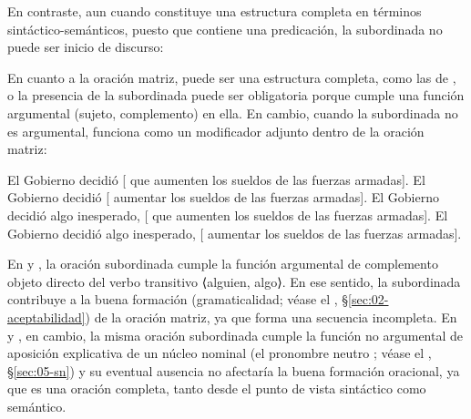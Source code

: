 En contraste, aun cuando constituye una estructura completa en términos
sintáctico-semánticos, puesto que contiene una predicación, la subordinada no
puede ser inicio de discurso:

\begin{exe}
  \ex
    \begin{xlist}
    \end{xlist}
\end{exe}

En cuanto a la oración matriz, puede ser una estructura completa, como las de
, o la presencia de la subordinada puede ser obligatoria
porque cumple una función argumental (sujeto, complemento) en ella. En cambio,
cuando la subordinada no es argumental, funciona como un modificador adjunto
dentro de la oración matriz:

\begin{exe}
  \ex\label{ex:13-decidio}
    \begin{xlist}
      \ex\label{ex:13-decidio-a} El Gobierno decidió [ que aumenten los
          sueldos de las fuerzas armadas].
      \ex\label{ex:13-decidio-b} El Gobierno decidió [ aumentar los
          sueldos de las fuerzas armadas].
      \ex\label{ex:13-decidio-c} El Gobierno decidió algo inesperado, [
          que aumenten los sueldos de las fuerzas armadas].
      \ex\label{ex:13-decidio-d} El Gobierno decidió algo inesperado, [
          aumentar los sueldos de las fuerzas armadas].
    \end{xlist}
\end{exe}

En  y , la oración subordinada
cumple la función argumental de complemento objeto directo del verbo transitivo
 ⟨alguien, algo⟩. En ese sentido, la subordinada contribuye a la
buena formación (gramaticalidad; véase el ,
§\ref{sec:02-aceptabilidad}) de la oración matriz, ya que
 forma una secuencia incompleta. En
 y , en cambio, la misma oración
subordinada cumple la función no argumental de aposición explicativa de un
núcleo nominal (el pronombre neutro ; véase el ,
§\ref{sec:05-sn}) y su eventual ausencia no afectaría la buena formación
oracional, ya que  es una oración
completa, tanto desde el punto de vista sintáctico como semántico.

